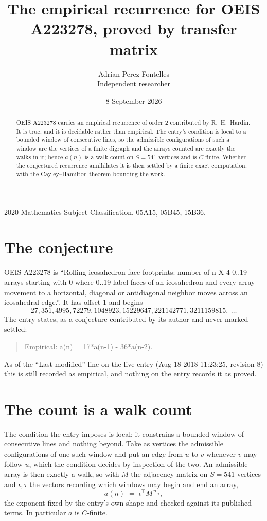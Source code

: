 \documentclass[11pt,a4paper]{article}
\title{The empirical recurrence for OEIS A223278, proved by transfer matrix}
\author{Adrian Perez Fontelles\\ \small Independent researcher}
\date{8 September 2026}
\theoremstyle{plain}
\theoremstyle{definition}
\begin{document}
\maketitle

\begin{abstract}
OEIS A223278 carries an empirical recurrence of order $2$ contributed by R.~H.~Hardin. It is
true, and it is decidable rather than empirical. The entry's condition is local to a bounded window of consecutive lines, so
the admissible configurations of such a window are the vertices of a finite digraph and the
arrays counted are exactly the walks in it; hence $a(n)$ is a walk count on $S=541$ vertices
and is $C$-finite. Whether the conjectured recurrence annihilates it is then settled by a
finite exact computation, with the Cayley--Hamilton theorem bounding the work.
\end{abstract}

\noindent\small 2020 Mathematics Subject Classification. 05A15, 05B45, 15B36.\normalsize

\section{The conjecture}

OEIS A223278 is ``Rolling icosahedron face footprints: number of n X 4 0..19 arrays starting with 0 where 0..19 label faces of an icosahedron and every array movement to a horizontal, diagonal or antidiagonal neighbor moves across an icosahedral edge.''. It has offset $1$ and begins
\[
27, 351, 4995, 72279, 1048923, 15229647, 221142771, 3211159815,\ \dots
\]
The entry states, as a conjecture contributed by its author and never marked settled:
\begin{quote}
Empirical: a(n) = 17*a(n-1) - 36*a(n-2).
\end{quote}
As of the ``Last modified'' line on the live entry (Aug 18 2018 11:23:25, revision 8) this is still
recorded as empirical, and nothing on the entry records it as proved.

\section{The count is a walk count}

The condition the entry imposes is local: it constrains a bounded window of consecutive lines and nothing beyond. Take as
vertices the admissible configurations of one such window and put an edge from $u$ to $v$
whenever $v$ may follow $u$, which the condition decides by inspection of the two. An
admissible array is then exactly a walk, so with $M$ the adjacency matrix on $S=541$ vertices
and $\iota,\tau$ the vectors recording which windows may begin and end an array,
\[
a(n)\;=\;\iota^{\!\top}M^{\,n}\tau ,
\]
the exponent fixed by the entry's own shape and checked against its published terms. In
particular $a$ is $C$-finite.
\end{document}
